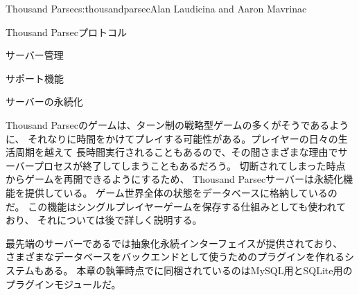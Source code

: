 \begin{aosachapter}{Thousand Parsec}{s:thousandparsec}{Alan Laudicina and Aaron Mavrinac}
\begin{aosasect1}{Thousand Parsecプロトコル}
\begin{aosasect2}{サーバー管理}
\end{aosasect2}

\end{aosasect1}

\begin{aosasect1}{サポート機能}

\begin{aosasect2}{サーバーの永続化}

Thousand Parsecのゲームは、ターン制の戦略型ゲームの多くがそうであるように、
それなりに時間をかけてプレイする可能性がある。プレイヤーの日々の生活周期を越えて
長時間実行されることもあるので、その間さまざまな理由でサーバープロセスが終了してしまうこともあるだろう。
切断されてしまった時点からゲームを再開できるようにするため、
Thousand Parsecサーバーは永続化機能を提供している。
ゲーム世界全体の状態をデータベースに格納しているのだ。
この機能はシングルプレイヤーゲームを保存する仕組みとしても使われており、
それについては後で詳しく説明する。

最先端のサーバーであるでは抽象化永続インターフェイスが提供されており、
さまざまなデータベースをバックエンドとして使うためのプラグインを作れるシステムもある。
本章の執筆時点でに同梱されているのはMySQL用とSQLite用のプラグインモジュールだ。


\end{aosasect2}
\end{aosasect1}
\end{aosachapter}
